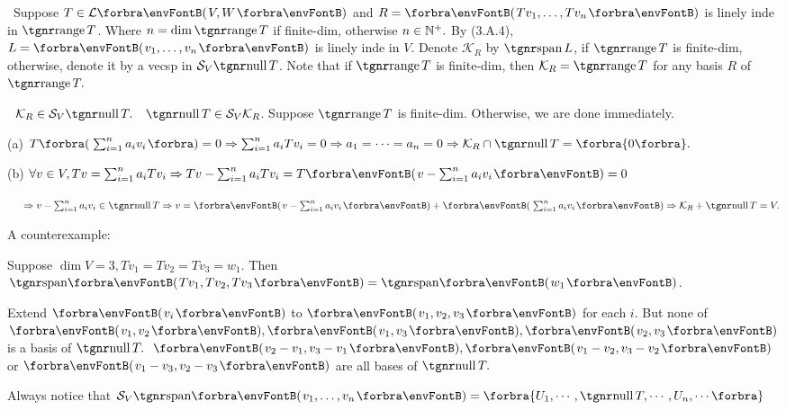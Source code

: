 \documentclass[a4paper, 11pt, UTF8]{article}
\begin{document}
\begin{large}
\BulletPoint \,\hspace{1pt}\NewNotation\TextB{}
Suppose $T\in\Lm{V,W}$ and $R=\Par{Tv_1,\dots,Tv_n}$ is linely inde in $\range T$.\TextB{}
Where $n=\dim\range T$ if finite-dim, otherwise $n\in{\mathbb{N}^+}.$\TextB{}
By (3.A.4), $L=\Par{v_1,\dots,v_n}$ is linely inde in $V$.\TextB{}
Denote $\mathcal{K}_R$ by $\Spn L$, if $\range T$ is finite-dim, otherwise, denote it by a vecsp in $\mathcal{S}_V\null T$.\TextB{}
Note that if $\range T$ is finite-dim, then $\mathcal{K}_R=\range T$ for any basis $R$ of $\range T.$\par\vspace{6pt}
\BulletPoint \,\hspace{1pt}\NewTheorem\,\,\,{\Large$\mathcal{K}_R\in\mathcal{S}_V\null T.$} \qquad\Comment\,\,\,$\null T\in\mathcal{S}_V \mathcal{K}_R$.\TextB{}
Suppose $\range T$ is finite-dim. Otherwise, we are done immediately.\par\vspace{6pt}\TextB{}
(a) $T\BigPar{\sum_{i=1}^n a_i v_i}=0\Rightarrow \sum_{i=1}^n a_i Tv_i=0\Rightarrow a_1=\dots=a_n=0\Rightarrow\mathcal{K}_R\cap\null T=\zeroSubs.$\par\vspace{6pt}\TextB{}
(b) $\forall v\in V, Tv=\sum_{i=1}^n a_i Tv_i\Rightarrow Tv-\sum_{i=1}^n a_i Tv_i=T\Par{v-\sum_{i=1}^n a_i v_i}=0$\par\vspace{6pt}\TextB{}
$\Hb\Rightarrow v-\sum_{i=1}^n a_i v_i\in\null T\Rightarrow v=\Par{v-\sum_{i=1}^n a_i v_i}+\Par{\sum_{i=1}^n a_i v_i}\Rightarrow\mathcal{K}_R+\null T=V.$\PfEnd
\SepLine

A counterexample:\par\quad
Suppose $\dim V=3, Tv_1=Tv_2=Tv_3=w_1.$ Then $\Span{Tv_1,Tv_2,Tv_3}=\Span{w_1}$.\par\quad
Extend $\Par{v_i}$ to $\Par{v_1,v_2,v_3}$ for each $i$. But none of $\Par{v_1,v_2},\Par{v_1,v_3},\Par{v_2,v_3}$ is a basis of $\null T.$\PfEnd[-15pt]
\Comment \,\,\,$\Par{v_2-v_1,v_3-v_1},\Par{v_1-v_2,v_3-v_2}$ or $\Par{v_1-v_3,v_2-v_3}$ are all bases of $\null T.$\par\Blind{\Comment\,\,}
Always notice that $\mathcal{S}_V\Span{v_1,\dots,v_n}=\Bra{U_1,\cdots,\null T,\cdots,U_n,\cdots}$\par
\SepLine


\end{large}
\end{document}
